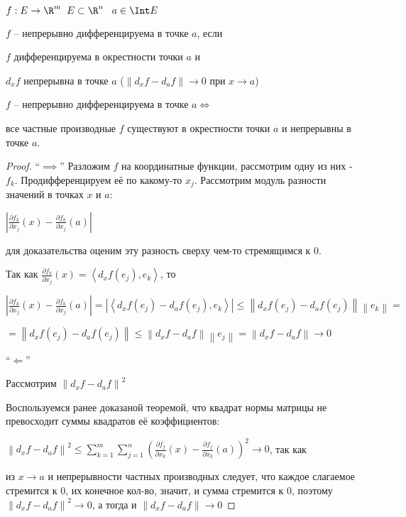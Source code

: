 
\begin{definition}\slashns
	
	$f: E \to \R^m \;\; E \subset \R^n \;\;\; a \in \Int E$
	
	$f$ -- непрерывно дифференцируема в точке $a$, если 

	$f$ дифференцируема в окрестности точки $a$ и 

	$d_x f$ непрерывна в точке $a$ ($\left\| d_x f - d_a f \right\| \to 0$ при $x \to a$)
\end{definition}

\begin{theorem}\slashns
	
	$f$ -- непрерывно дифференцируема в точке $a \iff$
	
	все частные производные $f$ существуют в окрестности точки $a$ и непрерывны в точке $a$.
\end{theorem}

\begin{proof}\slashns
	
	
	``$\implies$''
	Разложим $f$ на координатные функции, рассмотрим одну из них - $f_k$. Продифференцируем её по какому-то $x_j$. Рассмотрим модуль разности значений в точках $x$ и $a$:

	$\left|\frac{\partial f_k}{\partial x_j}(x) - \frac{\partial f_k}{\partial x_j}(a)\right|$

	для доказательства оценим эту разность сверху чем-то стремящимся к 0.

	Так как $\frac{\partial f_k}{\partial x_j} (x) = \left<d_x f(e_j), e_k\right>$, то

	$\left|\frac{\partial f_k}{\partial x_j}(x) - \frac{\partial f_k}{\partial x_j}(a)\right| = \left|\left<d_x f(e_j)-d_a f(e_j), e_k\right>\right| \le \left\|d_x f(e_j)-d_a f(e_j)\right\| \left\|e_k\right\|=$

	$=\left\|d_x f(e_j)-d_a f(e_j)\right\|\le \left\|d_x f-d_a f\right\| \left\|e_j\right\|=\left\|d_x f-d_a f\right\|\to 0$
	
	``$\Longleftarrow$''

	Рассмотрим $\left\|d_x f - d_a f\right\|^2$

	Воспользуемся ранее доказаной теоремой, что квадрат нормы матрицы не превосходит суммы квадратов её коэффициентов:
	
	$\left\|d_x f - d_a f\right\|^2 \le \sum\limits_{k = 1}^{m}\sum\limits_{j = 1}^{n}(\frac{\partial f_j}{\partial x_k}(x) - \frac{\partial f_j}{\partial x_k}(a))^2 \to 0$, так как

	из $x\to a$ и непрерывности частных производных следует, что каждое слагаемое стремится к 0, их конечное кол-во, значит, и сумма стремится к 0, поэтому $\left\|d_x f - d_a f\right\|^2\to0$, а тогда и $\left\|d_x f - d_a f\right\|\to0$
\end{proof}